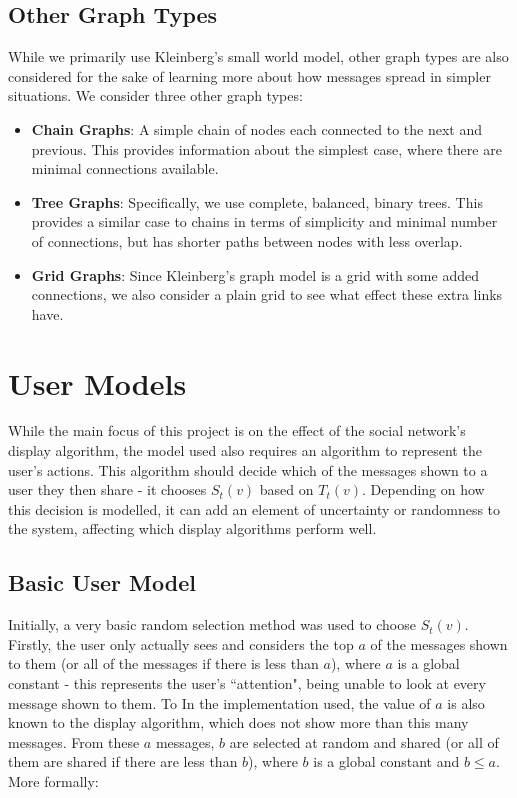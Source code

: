 \documentclass[bsc,frontabs,twoside,singlespacing,parskip,deptreport]{infthesis}     %
\begin{document}
\subsection{Other Graph Types}

While we primarily use Kleinberg's small world model, other graph types are also considered for the sake of learning more about how messages spread in simpler situations. We consider three other graph types:

\begin{itemize}
\item \textbf{Chain Graphs}: A simple chain of nodes each connected to the next and previous. This provides information about the simplest case, where there are minimal connections available.
\item \textbf{Tree Graphs}: Specifically, we use complete, balanced, binary trees. This provides a similar case to chains in terms of simplicity and minimal number of connections, but has shorter paths between nodes with less overlap.
\item \textbf{Grid Graphs}: Since Kleinberg's graph model is a grid with some added connections, we also consider a plain grid to see what effect these extra links have.
\end{itemize}

\section{User Models} \label{sec:user_models}
While the main focus of this project is on the effect of the social network's display algorithm, the model used also requires an algorithm to represent the user's actions. This algorithm should decide which of the messages shown to a user they then share - it chooses $S_{t}(v)$ based on $T_{t}(v)$. Depending on how this decision is modelled, it can add an element of uncertainty or randomness to the system, affecting which display algorithms perform well.

\subsection{Basic User Model}
Initially, a very basic random selection method was used to choose $S_{t}(v)$. Firstly, the user only actually sees and considers the top $a$ of the messages shown to them (or all of the messages if there is less than $a$), where $a$ is a global constant - this represents the user's ``attention", being unable to look at every message shown to them. To In the implementation used, the value of $a$ is also known to the display algorithm, which does not show more than this many messages. From these $a$ messages, $b$ are selected at random and shared (or all of them are shared if there are less than $b$), where $b$ is a global constant and $b \le a$. More formally:
\end{document}
